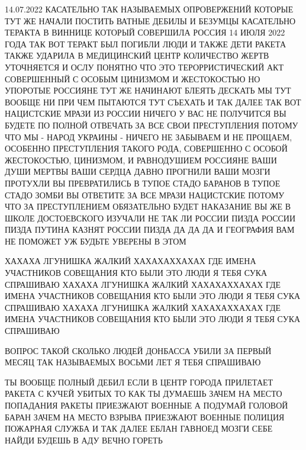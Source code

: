 14.07.2022
КАСАТЕЛЬНО ТАК НАЗЫВАЕМЫХ ОПРОВЕРЖЕНИЙ КОТОРЫЕ ТУТ ЖЕ НАЧАЛИ ПОСТИТЬ ВАТНЫЕ
ДЕБИЛЫ И БЕЗУМЦЫ КАСАТЕЛЬНО ТЕРАКТА В ВИННИЦЕ КОТОРЫЙ СОВЕРШИЛА РОССИЯ 14 ИЮЛЯ
2022 ГОДА ТАК ВОТ ТЕРАКТ БЫЛ ПОГИБЛИ ЛЮДИ И ТАКЖЕ ДЕТИ РАКЕТА ТАКЖЕ УДАРИЛА В
МЕДИЦИНСКИЙ ЦЕНТР КОЛИЧЕСТВО ЖЕРТВ УТОЧНЯЕТСЯ И ОСЛУ ПОНЯТНО ЧТО ЭТО
ТЕРОРРИСТИЧЕСКИЙ АКТ СОВЕРШЕННЫЙ С ОСОБЫМ ЦИНИЗМОМ И ЖЕСТОКОСТЬЮ НО УПОРОТЫЕ
РОССИЯНЕ ТУТ ЖЕ НАЧИНАЮТ БЛЕЯТЬ ДЕСКАТЬ МЫ ТУТ ВООБЩЕ НИ ПРИ ЧЕМ ПЫТАЮТСЯ ТУТ
СЪЕХАТЬ И ТАК ДАЛЕЕ ТАК ВОТ НАЦИСТСКИЕ МРАЗИ ИЗ РОССИИ НИЧЕГО У ВАС НЕ
ПОЛУЧИТСЯ ВЫ БУДЕТЕ ПО ПОЛНОЙ ОТВЕЧАТЬ ЗА ВСЕ СВОИ ПРЕСТУПЛЕНИЯ ПОТОМУ ЧТО МЫ -
НАРОД УКРАИНЫ - НИЧЕГО НЕ ЗАБЫВАЕМ И НЕ ПРОЩАЕМ, ОСОБЕННО ПРЕСТУПЛЕНИЯ ТАКОГО
РОДА, СОВЕРШЕННО С ОСОБОЙ ЖЕСТОКОСТЬЮ, ЦИНИЗМОМ, И РАВНОДУШИЕМ РОССИЯНЕ ВАШИ
ДУШИ МЕРТВЫ ВАШИ СЕРДЦА ДАВНО ПРОГНИЛИ ВАШИ МОЗГИ ПРОТУХЛИ ВЫ ПРЕВРАТИЛИСЬ В
ТУПОЕ СТАДО БАРАНОВ В ТУПОЕ СТАДО ЗОМБИ ВЫ ОТВЕТИТЕ ЗА ВСЕ МРАЗИ НАЦИСТСКИЕ
ПОТОМУ ЧТО ЗА ПРЕСТУПЛЕНИЕМ ОБЯЗАТЕЛЬНО БУДЕТ НАКАЗАНИЕ ВЫ ЖЕ В ШКОЛЕ
ДОСТОЕВСКОГО ИЗУЧАЛИ НЕ ТАК ЛИ РОССИИ ПИЗДА РОССИИ ПИЗДА ПУТИНА КАЗНЯТ РОССИИ
ПИЗДА ДА ДА ДА И ГЕОГРАФИЯ ВАМ НЕ ПОМОЖЕТ УЖ БУДЬТЕ УВЕРЕНЫ В ЭТОМ

ХАХАХА ЛГУНИШКА ЖАЛКИЙ ХАХАХАХХАХАХ ГДЕ ИМЕНА УЧАСТНИКОВ СОВЕЩАНИЯ КТО БЫЛИ ЭТО
ЛЮДИ Я ТЕБЯ СУКА СПРАШИВАЮ
ХАХАХА ЛГУНИШКА ЖАЛКИЙ ХАХАХАХХАХАХ ГДЕ ИМЕНА УЧАСТНИКОВ СОВЕЩАНИЯ КТО БЫЛИ ЭТО
ЛЮДИ Я ТЕБЯ СУКА СПРАШИВАЮ
ХАХАХА ЛГУНИШКА ЖАЛКИЙ ХАХАХАХХАХАХ ГДЕ ИМЕНА УЧАСТНИКОВ СОВЕЩАНИЯ КТО БЫЛИ ЭТО
ЛЮДИ Я ТЕБЯ СУКА СПРАШИВАЮ

ВОПРОС ТАКОЙ СКОЛЬКО ЛЮДЕЙ ДОНБАССА УБИЛИ ЗА ПЕРВЫЙ МЕСЯЦ ТАК НАЗЫВАЕМЫХ ВОСЬМИ
ЛЕТ Я ТЕБЯ СПРАШИВАЮ

ТЫ ВООБЩЕ ПОЛНЫЙ ДЕБИЛ ЕСЛИ В ЦЕНТР ГОРОДА ПРИЛЕТАЕТ РАКЕТА С КУЧЕЙ УБИТЫХ ТО
КАК ТЫ ДУМАЕШЬ ЗАЧЕМ НА МЕСТО ПОПАДАНИЯ РАКЕТЫ ПРИЕЗЖАЮТ ВОЕННЫЕ А ПОДУМАЙ
ГОЛОВОЙ БАРАН ЗАЧЕМ НА МЕСТО ВЗРЫВА ПРИЕЗЖАЮТ ВОЕННЫЕ ПОЛИЦИЯ ПОЖАРНАЯ СЛУЖБА И
ТАК ДАЛЕЕ ЕБЛАН ГАВНОЕД МОЗГИ СЕБЕ НАЙДИ БУДЕШЬ В АДУ ВЕЧНО ГОРЕТЬ

